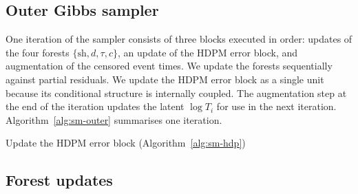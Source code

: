 \subsection{Outer Gibbs sampler}

One iteration of the sampler consists of three blocks executed in order: updates of the four forests $\{\mathrm{sh}, d, \tau, c\}$, an update of the HDPM error block, and augmentation of the censored event times.
We update the forests sequentially against partial residuals.
We update the HDPM error block as a single unit because its conditional structure is internally coupled.
The augmentation step at the end of the iteration updates the latent $\log T_i$ for use in the next iteration.
Algorithm~\ref{alg:sm-outer} summarises one iteration.

\begin{algorithm}[H]
\caption{Outer Gibbs sampler, one iteration.}
\label{alg:sm-outer}
\vspace{1ex}

\vspace{1ex}

Update the HDPM error block (Algorithm~\ref{alg:sm-hdp})\;
\vspace{1ex}

\end{algorithm}

\subsection{Forest updates}


